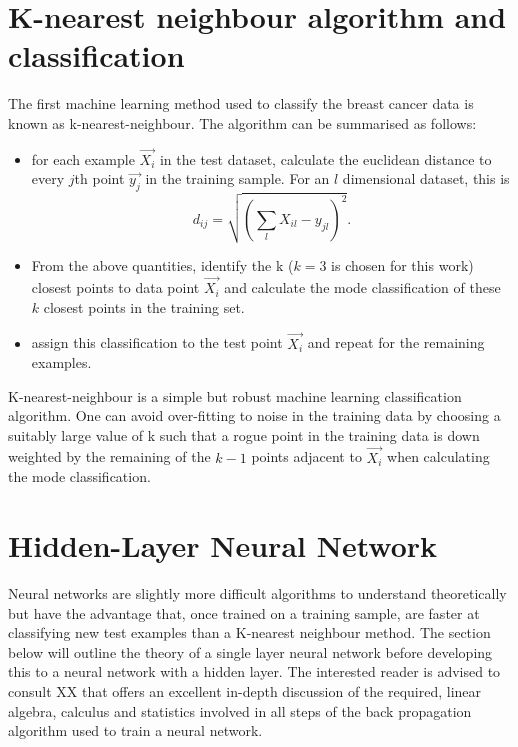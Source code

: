 \documentclass[10pt]{article}
\begin{document}
\section{K-nearest neighbour algorithm and classification}
The first machine learning method used to classify the breast cancer data is known as k-nearest-neighbour. The algorithm can be summarised as follows:

\begin{itemize}
\item for each example $\vec{X_i}$ in the test dataset, calculate the euclidean distance to every $j$th point $\vec{y_j}$ in the training sample. For an $l$ dimensional dataset, this is 
\begin{equation}
d_{ij} = \sqrt{\left( \sum_l X_{il} - y_{jl} \right)^2}.
\label{eq_euclid}
\end{equation}

\item From the above quantities, identify the k ($k = 3$ is chosen for this work) closest points to data point $\vec{X_i}$ and calculate the mode classification of these $k$ closest points in the training set.

\item assign this classification to the test point $\vec{X_i}$ and repeat for the remaining examples.


\end{itemize}


K-nearest-neighbour is a simple but robust machine learning classification algorithm. One can avoid over-fitting to noise in the training data by choosing a suitably large value of k such that a rogue point in the training data is down weighted by the remaining of the $k-1$ points adjacent to $\vec{X_i}$ when calculating the mode classification.








\section{Hidden-Layer Neural Network}

Neural networks are slightly more difficult algorithms to understand theoretically but have the advantage that, once trained on a training sample, are faster at classifying new test examples than a K-nearest neighbour method.  The section below will outline the theory of a single layer neural network before developing this to a neural network with a hidden layer. The interested reader is advised to consult XX that offers an excellent in-depth discussion of the required, linear algebra, calculus and statistics involved in all steps of the back propagation algorithm used to train a neural network.
\end{document}
